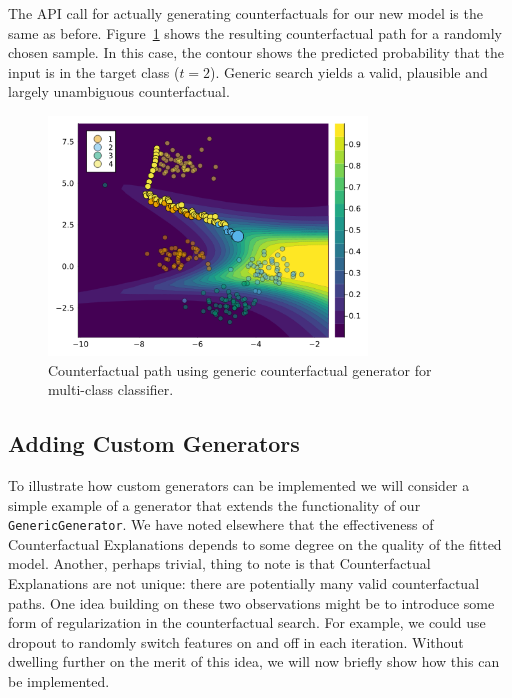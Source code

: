 \documentclass[
  letterpaper,
  DIV=11,
  numbers=noendperiod]{scrartcl}
\begin{document}
The API call for actually generating counterfactuals for our new model
is the same as before. Figure~\ref{fig-multi} shows the resulting
counterfactual path for a randomly chosen sample. In this case, the
contour shows the predicted probability that the input is in the target
class (\(t=2\)). Generic search yields a valid, plausible and largely
unambiguous counterfactual.

\begin{figure}

{\centering \includegraphics[width=3.33333in,height=2.5in]{www/ce_multi.png}

}

\caption{\label{fig-multi}Counterfactual path using generic
counterfactual generator for multi-class classifier.}

\end{figure}

\hypertarget{sec-custom-gen}{%
\subsection{Adding Custom Generators}\label{sec-custom-gen}}

To illustrate how custom generators can be implemented we will consider
a simple example of a generator that extends the functionality of our
\texttt{GenericGenerator}. We have noted elsewhere that the
effectiveness of Counterfactual Explanations depends to some degree on
the quality of the fitted model. Another, perhaps trivial, thing to note
is that Counterfactual Explanations are not unique: there are
potentially many valid counterfactual paths. One idea building on these
two observations might be to introduce some form of regularization in
the counterfactual search. For example, we could use dropout to randomly
switch features on and off in each iteration. Without dwelling further
on the merit of this idea, we will now briefly show how this can be
implemented.
\end{document}

